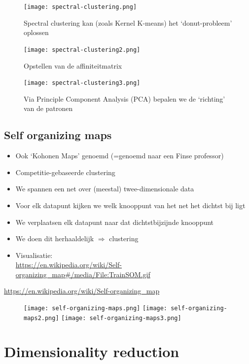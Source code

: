 \documentclass{article}
\begin{document}
\begin{figure}[H]
    \centering
    \texttt{[image: spectral-clustering.png]}
    \caption{Spectral clustering kan (zoals Kernel K-means) het `donut-probleem' oplossen}
\end{figure}

\begin{figure}[H]
    \centering
    \texttt{[image: spectral-clustering2.png]}
    \caption{Opstellen van de affiniteitmatrix}
\end{figure}

\begin{figure}[H]
    \centering
    \texttt{[image: spectral-clustering3.png]}
    \caption{Via Principle Component Analysis (PCA) bepalen we de `richting' van de patronen}
\end{figure}

\subsection{Self organizing maps}

\begin{itemize}
    \item Ook `Kohonen Maps' genoemd (=genoemd naar een Finse professor)
    \item Competitie-gebaseerde clustering
    \item We spannen een net over (meestal) twee-dimensionale data
    \item Voor elk datapunt kijken we welk knooppunt van het net het dichtst bij ligt
    \item We verplaatsen elk datapunt naar dat dichtstbijzijnde knooppunt 
    \item We doen dit herhaaldelijk $\Rightarrow$ clustering
    \item Visualisatie: \\ \url{https://en.wikipedia.org/wiki/Self-organizing_map#/media/File:TrainSOM.gif}
\end{itemize}

\url{https://en.wikipedia.org/wiki/Self-organizing_map}

\begin{figure}[H]
    \centering
    \texttt{[image: self-organizing-maps.png]}
    \texttt{[image: self-organizing-maps2.png]}
    \texttt{[image: self-organizing-maps3.png]}
    \caption{}
\end{figure}

\section{Dimensionality reduction}
\end{document}
